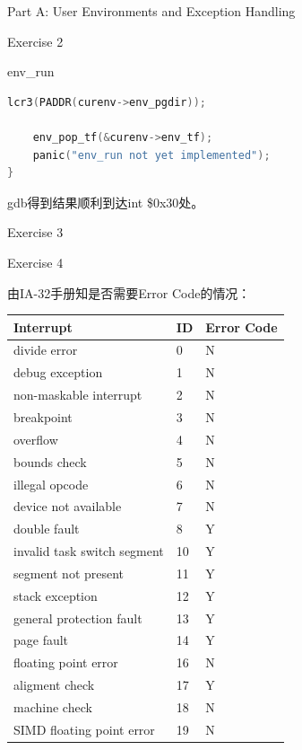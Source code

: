 \documentclass[GBK,winfonts,a4paper,10pt]{ctexart}
\begin{document}
\begin{section}{ Part A: User Environments and Exception Handling }
\begin{subsection}{ Exercise 2 }
\begin{subsubsection}{env\_run}
\begin{lstlisting}[language=C]
    lcr3(PADDR(curenv->env_pgdir));

    env_pop_tf(&curenv->env_tf);    
	panic("env_run not yet implemented");
}
\end{lstlisting}
\end{subsubsection}

\par
gdb得到结果顺利到达int \$0x30处。
\end{subsection}

\begin{subsection}{ Exercise 3 }
\end{subsection}

\begin{subsection}{ Exercise 4 }
\par
由IA-32手册知是否需要Error Code的情况：
\begin{center}
    \begin{tabular}{ | l | l | l |}
    \hline
Interrupt   &   ID   &   Error Code  \\ \hline
divide error	&	0	&	N	\\ \hline 				
debug exception &  1  & N	\\ \hline 
non-maskable interrupt	&	2	&	N	\\ \hline 
breakpoint	&	3	&	N	\\ \hline 
overflow		&	4	&	N	\\ \hline 
bounds check		&	5	&	N	\\ \hline 
illegal opcode	&	6	&	N	\\ \hline 
device not available		&	7	&	N	\\ \hline 
double fault				&	8	&   Y	\\ \hline 
invalid task switch segment	&	10	&	Y	\\ \hline 
segment not present	&	11	&	Y	\\ \hline 
stack exception	&	12	&	Y	\\ \hline 
general protection fault	&	13	&	Y	\\ \hline 
page fault	&	14	&	Y	\\ \hline 
floating point error	&	16	&	N	\\ \hline 
aligment check	&	17	&	Y		\\ \hline 
machine check		&	18	&	N	\\ \hline 
SIMD floating point error		&	19	&	N	\\ \hline
    \end{tabular}
\end{center}


\end{subsection}
\end{section}
\end{document}

